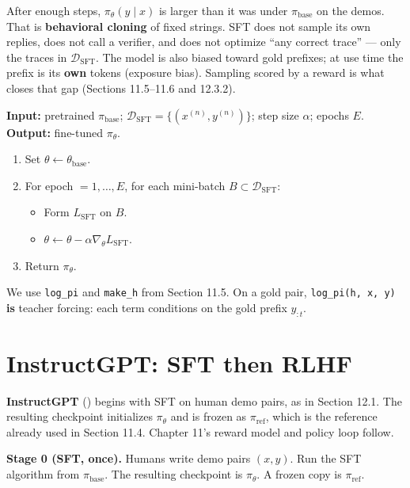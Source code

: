 After enough steps, $\pi_\theta(y\mid x)$ is larger than it was under $\pi_{\mathrm{base}}$ on the demos. That is \textbf{behavioral cloning} of fixed strings. SFT does not sample its own replies, does not call a verifier, and does not optimize ``any correct trace'' --- only the traces in $\mathcal{D}_{\mathrm{SFT}}$. The model is also biased toward gold prefixes; at use time the prefix is its \textbf{own} tokens (exposure bias). Sampling scored by a reward is what closes that gap (Sections 11.5--11.6 and 12.3.2).

\begin{implnote}
\textbf{Input:} pretrained $\pi_{\mathrm{base}}$; $\mathcal{D}_{\mathrm{SFT}}=\{(x^{(n)},y^{(n)})\}$; step size $\alpha$; epochs $E$. \textbf{Output:} fine-tuned $\pi_\theta$.

\begin{enumerate}
\item Set $\theta\leftarrow\theta_{\mathrm{base}}$.
\item For epoch $=1,\ldots,E$, for each mini-batch $B\subset\mathcal{D}_{\mathrm{SFT}}$:
\begin{itemize}
\item Form $L_{\mathrm{SFT}}$ on $B$.
\item $\theta\leftarrow\theta-\alpha\nabla_\theta L_{\mathrm{SFT}}$.
\end{itemize}
\item Return $\pi_\theta$.
\end{enumerate}

\end{implnote}

We use \texttt{log\_pi} and \texttt{make\_h} from Section 11.5. On a gold pair, \texttt{log\_pi(h, x, y)} \textbf{is} teacher forcing: each term conditions on the gold prefix $y_{:t}$.




\section{InstructGPT: SFT then RLHF}

\textbf{InstructGPT} () begins with SFT on human demo pairs, as in Section 12.1. The resulting checkpoint initializes $\pi_\theta$ and is frozen as $\pi_{\mathrm{ref}}$, which is the reference already used in Section 11.4. Chapter 11's reward model and policy loop follow.

\textbf{Stage 0 (SFT, once).} Humans write demo pairs $(x,y)$. Run the SFT algorithm from $\pi_{\mathrm{base}}$. The resulting checkpoint is $\pi_\theta$. A frozen copy is $\pi_{\mathrm{ref}}$.

